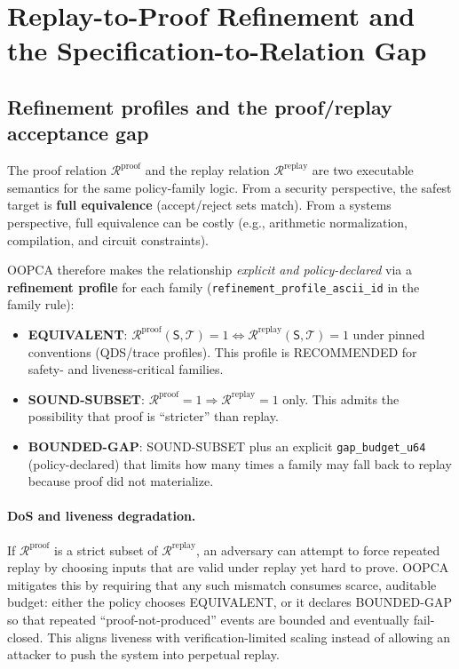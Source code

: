 \documentclass[11pt]{article}
\newcommand{\Rel}{\mathcal{R}}
\newcommand{\Trace}{\mathcal{T}}
\newcommand{\Stmt}{\mathsf{S}}
\begin{document}
\section{Replay-to-Proof Refinement and the Specification-to-Relation Gap}\label{sec:refinement}

\subsection{Refinement profiles and the proof/replay acceptance gap}\label{sec:ref-profiles}

The proof relation $\Rel^{\text{proof}}$ and the replay relation $\Rel^{\text{replay}}$ are two executable semantics for the same policy-family logic.
From a security perspective, the safest target is \textbf{full equivalence} (accept/reject sets match).
From a systems perspective, full equivalence can be costly (e.g., arithmetic normalization, compilation, and circuit constraints).

OOPCA therefore makes the relationship \emph{explicit and policy-declared} via a \textbf{refinement profile} for each family (\texttt{refinement\_profile\_ascii\_id} in the family rule):

\begin{itemize}[leftmargin=1.2em]
  \item \textbf{EQUIVALENT}: $\Rel^{\text{proof}}(\Stmt,\Trace)=1 \iff \Rel^{\text{replay}}(\Stmt,\Trace)=1$ under pinned conventions (QDS/trace profiles). This profile is RECOMMENDED for safety- and liveness-critical families.
  \item \textbf{SOUND-SUBSET}: $\Rel^{\text{proof}}=1 \Rightarrow \Rel^{\text{replay}}=1$ only. This admits the possibility that proof is ``stricter'' than replay.
  \item \textbf{BOUNDED-GAP}: SOUND-SUBSET plus an explicit \texttt{gap\_budget\_u64} (policy-declared) that limits how many times a family may fall back to replay because proof did not materialize.
\end{itemize}

\paragraph{DoS and liveness degradation.}
If $\Rel^{\text{proof}}$ is a strict subset of $\Rel^{\text{replay}}$, an adversary can attempt to force repeated replay by choosing inputs that are valid under replay yet hard to prove.
OOPCA mitigates this by requiring that any such mismatch consumes scarce, auditable budget:
either the policy chooses EQUIVALENT, or it declares BOUNDED-GAP so that repeated ``proof-not-produced'' events are bounded and eventually fail-closed.
This aligns liveness with verification-limited scaling instead of allowing an attacker to push the system into perpetual replay.
\end{document}
